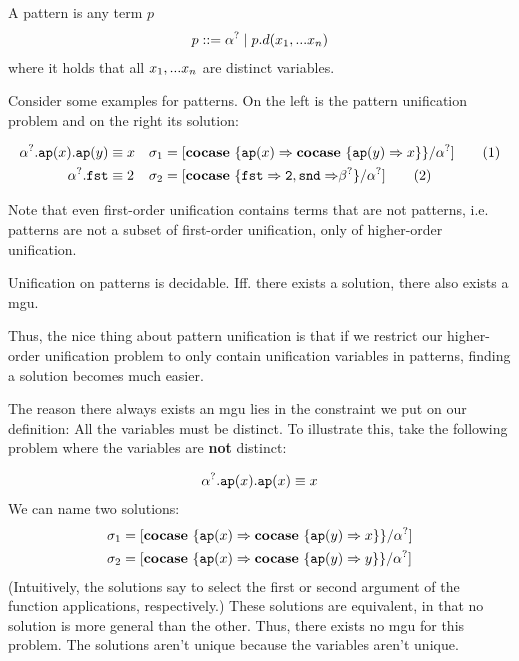 \documentclass[twoside,12pt,a4paper]{article}
\begin{document}
\begin{definition}[Pattern]
    A pattern is any term $p$ 
    \begin{align*}
        p ::= \alpha^? \;|\; p.d(x_1,...x_n)
    \end{align*}
    where it holds that all $x_1,...x_n$ are distinct variables.
\end{definition}

Consider some examples for patterns. On the left is the pattern unification problem and on the right its solution:
\begin{example}[Pattern]
    \begin{align*}
        \alpha^?.\texttt{ap}(x).\texttt{ap}(y)&\equiv x &\sigma_1 &= [\textbf{cocase}\ \{\texttt{ap}(x)\Rightarrow\textbf{cocase}\ \{\texttt{ap}(y)\Rightarrow x\}\}/\alpha^?] \tag{1}\\
        \alpha^?.\mathtt{fst} &\equiv 2 &\sigma_2 &= [\textbf{cocase}\ \{\mathtt{fst\Rightarrow 2, snd \Rightarrow}\beta^?\}/\alpha^?] \tag{2}
    \end{align*}   
\end{example}

Note that even first-order unification contains terms that are not patterns, i.e.
patterns are not a subset of first-order unification, only of higher-order unification.

\begin{theorem}
    Unification on patterns is decidable.
    Iff. there exists a solution, there also exists a mgu.
\end{theorem}
Thus, the nice thing about pattern unification is that if we restrict our higher-order unification problem to only contain unification variables in patterns, 
finding a solution becomes much easier. 

The reason there always exists an mgu lies in the constraint we put on our definition: All the variables must be distinct. 
To illustrate this, take the following problem where the variables are \textbf{not} distinct:
\begin{example}
    \begin{align*}
        \alpha^?.\texttt{ap}(x).\texttt{ap}(x)\equiv x
    \end{align*}  
    We can name two solutions:
\begin{align*}
    \sigma_1 &= [\textbf{cocase}\ \{\texttt{ap}(x)\Rightarrow \textbf{cocase}\ \{\texttt{ap}(y)\Rightarrow x\}\}/\alpha^?]\\
    \sigma_2 &=[\textbf{cocase}\ \{\texttt{ap}(x)\Rightarrow \textbf{cocase}\ \{\texttt{ap}(y)\Rightarrow y\}\}/\alpha^?]  
\end{align*}
(Intuitively, the solutions say to select the first or second argument of the function applications, respectively.)
These solutions are equivalent, in that no solution is more general than the other. Thus, there exists no mgu for this problem.
The solutions aren't unique because the variables aren't unique.  
\end{example}
\end{document}
